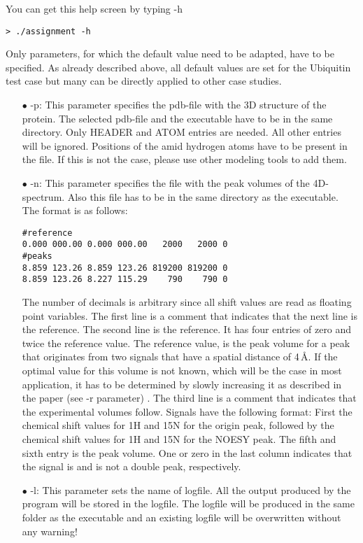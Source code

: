 \documentclass{scrartcl}
\begin{document}
You can get this help screen by typing -h
\begin{verbatim}
> ./assignment -h
\end{verbatim}

Only parameters, for which the default value need to be adapted, have to be specified. As already described above, all default values are set for the Ubiquitin test case but many can be directly applied to other case studies.

\begin{itemize}
\item[$\bullet$] -p: This parameter specifies the pdb-file with the 3D structure of the protein. The selected pdb-file and the executable have to be in the same directory. Only HEADER and ATOM entries are needed. All other entries will be ignored. Positions of the amid hydrogen atoms have to be present in the file. If this is not the case, please use other modeling tools to add them.

\item[$\bullet$] -n: This parameter specifies the file with the peak volumes of the 4D-spectrum. Also this file has to be in the same directory as the executable. The format is as follows:
\begin{verbatim}
#reference
0.000 000.00 0.000 000.00   2000   2000 0
#peaks
8.859 123.26 8.859 123.26 819200 819200 0
8.859 123.26 8.227 115.29    790    790 0
\end{verbatim}

The number of decimals is arbitrary since all shift values are read as floating point variables.
The first line is a comment that indicates that the next line is the reference. The second line is the reference. It has four entries of zero and twice the reference value. The reference value, is the peak volume for a peak that originates from
two signals that have a spatial distance of 4\,\AA . If the optimal value for this volume is not known, which will be the case in most application, it has to be determined by slowly increasing it as described in the paper (see -r parameter) . 
The third line is a comment that indicates that the experimental volumes follow. Signals have the following format:
First the chemical shift values for 1H and 15N for the origin peak, followed by the chemical shift values for 1H and 15N for the NOESY peak. The fifth and sixth entry is the peak volume. 
One or zero in the last column indicates that the signal is and is not a double peak, respectively.

\item[$\bullet$] -l: This parameter sets the name of logfile. All the output produced by the program will be stored in the logfile. The logfile will be produced in the same folder as the executable and an existing logfile will be overwritten without any warning!


\end{itemize}
\end{document}
